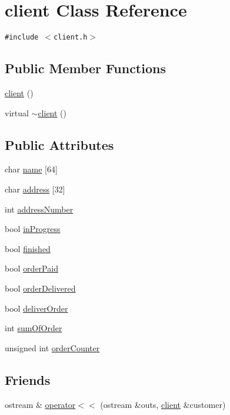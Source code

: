 \hypertarget{classclient}{
\section{client Class Reference}
\label{classclient}
}
{\tt \#include $<$client.h$>$}

\subsection*{Public Member Functions}
\begin{CompactItemize}
\item 
\hyperlink{classclient_b53a10e7f29eac1a359e54efc484e96e}{client} ()
\item 
virtual \hyperlink{classclient_f615a256c40006da0684c8baae2da7cb}{$\sim$client} ()
\end{CompactItemize}
\subsection*{Public Attributes}
\begin{CompactItemize}
\item 
char \hyperlink{classclient_275f6727040426992bb1c8e247d38cde}{name} \mbox{[}64\mbox{]}
\item 
char \hyperlink{classclient_06a8d016fa013b9fc60bcc24da937701}{address} \mbox{[}32\mbox{]}
\item 
int \hyperlink{classclient_6ab3066cc6893cf6833b2871ecdebaf2}{address\-Number}
\item 
bool \hyperlink{classclient_292db71ff1a82008b52bc6f74bd0419e}{in\-Progress}
\item 
bool \hyperlink{classclient_a5d7ceb2c59b8cee46c2953fec9abc19}{finished}
\item 
bool \hyperlink{classclient_8498e9222401c9034d4e5a26970a3400}{order\-Paid}
\item 
bool \hyperlink{classclient_63c4891c26137238d3075aa6a395c235}{order\-Delivered}
\item 
bool \hyperlink{classclient_48e3b11844a6747c24de0ff69018f775}{deliver\-Order}
\item 
int \hyperlink{classclient_89b86d03136dc2f044d7669137baf6b5}{sum\-Of\-Order}
\item 
unsigned int \hyperlink{classclient_25f95fa8cae78c29d5fe90cb9879944a}{order\-Counter}
\end{CompactItemize}
\subsection*{Friends}
\begin{CompactItemize}
\item 
ostream \& \hyperlink{classclient_9f09335faadcf7eaacdcd326c26f5d99}{operator$<$$<$} (ostream \&outs, \hyperlink{classclient}{client} \&customer)
\end{CompactItemize}


